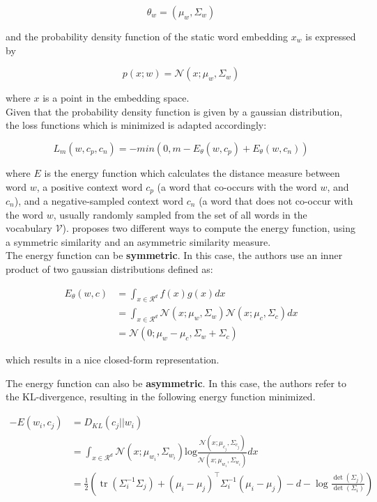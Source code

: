 \documentclass[a4paper,12pt,oneside,openright]{report}
\begin{document}
$$
\theta_w = ( \mu_w,  \Sigma_w)
$$

and the probability density function of the static word embedding $x_w$ is expressed by

\begin{equation}
p(x; w) = \mathcal{N}\left(x ; \mu_{w}, \Sigma_{w}\right)
\end{equation}

where $x$ is a point in the embedding space. \\

Given that the probability density function is given by a gaussian distribution, the loss functions which is minimized is adapted accordingly:

\begin{equation}
L_m(w, c_p, c_n) = - min(0, m - E_\theta(w, c_p) + E_\theta(w, c_n) )
\end{equation}

where $E$ is the energy function which calculates the distance measure between word $w$, a positive context word $c_p$ (a word that co-occurs with the word $w$, and $c_n$), and a negative-sampled context word $c_n$ (a word that does not co-occur with the word $w$, usually randomly sampled from the set of all words in the vocabulary $\mathcal{V}$).
\cite{vilnis14} proposes two different ways to compute the energy function, using a symmetric similarity and an asymmetric similarity measure. \\

The energy function can be \textbf{symmetric}.
In this case, the authors use an inner product of two gaussian distributions defined as:

\begin{align}
E_\theta(w, c) &= \int_{x \in \mathcal{R}^d} f(x)g(x) dx \\
&= \int_{x \in \mathcal{R}^d} \mathcal{N}(x; \mu_w, \Sigma_w) \mathcal{N}(x; \mu_c, \Sigma_c) dx \\
&= \mathcal{N}(0; \mu_w - \mu_c, \Sigma_w + \Sigma_c)
\end{align}

which results in a nice closed-form representation. 

The energy function can also be \textbf{asymmetric}.
In this case, the authors refer to the KL-divergence, resulting in the following energy function minimized.

\begin{align}
-E(w_i, c_j) & = D_{KL}(c_j || w_i) \\
&= \int_{x \in \mathcal{R}^d} \mathcal{N}(x; \mu_{w_i}, \Sigma_{w_i}) \text{log} \frac{\mathcal{N}(x; \mu_{c_j}, \Sigma_{c_j})}{\mathcal{N}(x; \mu_{w_i}, \Sigma_{w_i})} dx \\
&= \frac{1}{2}\left(\operatorname{tr}\left(\Sigma_{i}^{-1} \Sigma_{j}\right)+\left(\mu_{i}-\mu_{j}\right)^{\top} \Sigma_{i}^{-1}\left(\mu_{i}-\mu_{j}\right)-d-\log \frac{\operatorname{det}\left(\Sigma_{j}\right)}{\operatorname{det}\left(\Sigma_{i}\right)}\right)
\end{align}
\end{document}
